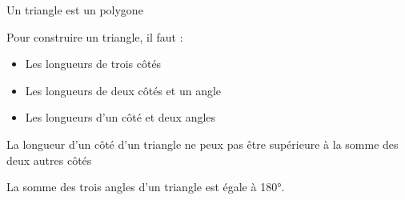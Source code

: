 {Un triangle est un polygone}

{Pour construire un triangle, il faut :
\begin{itemize}
    \item Les longueurs de trois côtés
    \item Les longueurs de deux côtés et un angle
    \item Les longueurs d'un côté et deux angles
\end{itemize}}

{
    La longueur d'un côté d'un triangle ne peux pas être supérieure à la somme des deux autres côtés
}

{La somme des trois angles d'un triangle est égale à 180°.}

